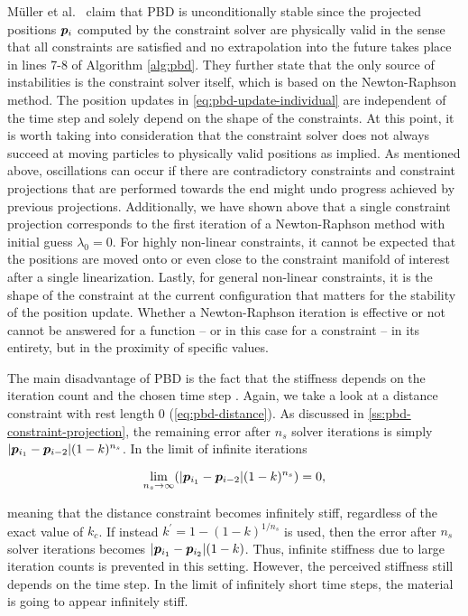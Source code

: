 Müller et al.\ \cite{mueller2006} claim that PBD is unconditionally stable since the projected positions $\bm{p}_i$ computed by the constraint 
solver are physically valid in the sense that all constraints are satisfied and no extrapolation into the future takes place in lines 7-8 of
Algorithm \ref{alg:pbd}. They further state that the only source of instabilities is the constraint solver itself, which is based on the Newton-Raphson 
method. The position updates in \autoref{eq:pbd-update-individual} are independent of the time step and solely depend on the shape of the
constraints. At this point, it is worth taking into consideration that the constraint solver does not always succeed at moving particles to 
physically valid
positions as implied. As mentioned above, oscillations can occur if there are contradictory constraints and constraint projections that are 
performed towards the end might undo progress achieved by previous projections. Additionally, we have shown above that a single constraint 
projection corresponds to the first iteration of a Newton-Raphson method with initial guess $\lambda_0 = 0$. For highly non-linear constraints, 
it cannot be expected that the positions are moved onto or even close to the constraint manifold of interest after a single linearization. 
Lastly, for general non-linear constraints, it is the shape of the constraint at the current configuration that matters for the stability of 
the position update. Whether a Newton-Raphson iteration is effective or not cannot be answered for a function -- or in this case for a 
constraint -- in its entirety, but in the proximity of specific values.

The main disadvantage of PBD is the fact that the stiffness depends on the iteration count and the chosen time step \cite{mueller2006}. Again, 
we take a look at
a distance constraint with rest length 0 (\cref{eq:pbd-distance}). As discussed in \cref{ss:pbd-constraint-projection}, the remaining error after
$n_s$ solver iterations is simply $\vert \bm{p}_{i_1} - \bm{p}_{i-2} \vert (1-k)^{n_s}$. In the limit of infinite iterations

\[
    \lim_{n_s \to \infty} (\vert \bm{p}_{i_1} - \bm{p}_{i-2} \vert (1-k)^{n_s}) = 0,
\]

\noindent meaning that the distance constraint becomes infinitely stiff, regardless of the exact value of $k_c$. If instead $k^{\prime}
= 1 - (1-k)^{1/n_s}$ is used, then the error after $n_s$ solver iterations becomes $\vert \bm{p}_{i_1} - \bm{p}_{i_2} \vert (1-k)$. Thus,
infinite stiffness due to large iteration counts is prevented in this setting. However, the perceived stiffness still depends on the time
step. In the limit of infinitely short time steps, the material is going to appear infinitely stiff. 

